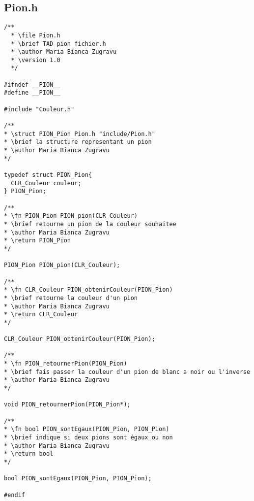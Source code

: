 \subsection{Pion.h}
\begin{lstlisting}
/**
  * \file Pion.h
  * \brief TAD pion fichier.h
  * \author Maria Bianca Zugravu
  * \version 1.0
  */

#ifndef __PION__
#define __PION__

#include "Couleur.h"

/**
* \struct PION_Pion Pion.h "include/Pion.h"
* \brief la structure representant un pion
* \author Maria Bianca Zugravu
*/

typedef struct PION_Pion{
  CLR_Couleur couleur;
} PION_Pion;

/**
* \fn PION_Pion PION_pion(CLR_Couleur)
* \brief retourne un pion de la couleur souhaitee
* \author Maria Bianca Zugravu
* \return PION_Pion
*/

PION_Pion PION_pion(CLR_Couleur);

/**
* \fn CLR_Couleur PION_obtenirCouleur(PION_Pion)
* \brief retourne la couleur d'un pion
* \author Maria Bianca Zugravu
* \return CLR_Couleur
*/

CLR_Couleur PION_obtenirCouleur(PION_Pion);

/**
* \fn PION_retournerPion(PION_Pion)
* \brief fais passer la couleur d'un pion de blanc a noir ou l'inverse
* \author Maria Bianca Zugravu
*/

void PION_retournerPion(PION_Pion*);

/**
* \fn bool PION_sontEgaux(PION_Pion, PION_Pion)
* \brief indique si deux pions sont égaux ou non
* \author Maria Bianca Zugravu
* \return bool
*/

bool PION_sontEgaux(PION_Pion, PION_Pion);

#endif
\end{lstlisting}

